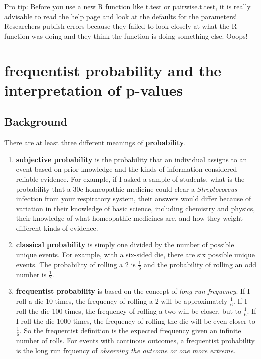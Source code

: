 \documentclass[]{book}
\begin{document}
Pro tip: Before you use a new R function like t.test or pairwise.t.test,
it is really advisable to read the help page and look at the defaults
for the parameters! Researchers publish errors because they failed to
look closely at what the R function was doing and they think the
function is doing something else. Ooops!

\section{frequentist probability and the interpretation of
p-values}\label{frequentist-probability-and-the-interpretation-of-p-values}

\subsection{Background}\label{background}

There are at least three different meanings of \textbf{probability}.

\begin{enumerate}
\def\labelenumi{\arabic{enumi}.}
\item
  \textbf{subjective probability} is the probability that an individual
  assigns to an event based on prior knowledge and the kinds of
  information considered reliable evidence. For example, if I asked a
  sample of students, what is the probability that a 30c homeopathic
  medicine could clear a \emph{Streptococcus} infection from your
  respiratory system, their answers would differ because of variation in
  their knowledge of basic science, including chemistry and physics,
  their knowledge of what homeopathic medicines are, and how they weight
  different kinds of evidence.
\item
  \textbf{classical probability} is simply one divided by the number of
  possible unique events. For example, with a six-sided die, there are
  six possible unique events. The probability of rolling a 2 is
  \(\frac{1}{6}\) and the probability of rolling an odd number is
  \(\frac{1}{2}\).
\item
  \textbf{frequentist probability} is based on the concept of
  \textit{long run frequency}. If I roll a die 10 times, the frequency
  of rolling a 2 will be approximately \(\frac{1}{6}\). If I roll the
  die 100 times, the frequency of rolling a two will be closer, but to
  \(\frac{1}{6}\). If I roll the die 1000 times, the frequency of
  rolling the die will be even closer to \(\frac{1}{6}\). So the
  frequentist definition is the expected frequency given an infinite
  number of rolls. For events with continous outcomes, a frequentist
  probability is the long run frquency of \emph{observing the outcome or
  one more extreme}.
\end{enumerate}
\end{document}
